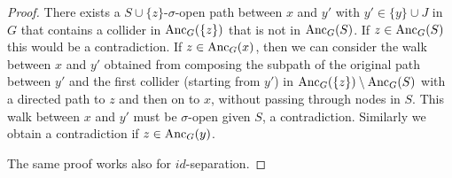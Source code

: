 \begin{proof}
There exists a $S \cup \{z\}$-$\sigma$-open path between $x$ and $y'$ with $y' \in \{y\} \cup J$ in $G$ that contains a collider in $\mathrm{Anc}_{G}(\{z\})$ that is not in $\mathrm{Anc}_{G}(S)$. 
If $z \in \mathrm{Anc}_{G}(S)$ this would be a contradiction.
If $z \in \mathrm{Anc}_{G}(x)$, then we can consider the walk between $x$ and $y'$ obtained from composing the subpath of the original path between $y'$ and the first collider (starting from $y'$) in $\mathrm{Anc}_{G}(\{z\}) \setminus \mathrm{Anc}_{G}(S)$ with a directed path to $z$ and then on to $x$, without passing through nodes in $S$.
This walk between $x$ and $y'$ must be $\sigma$-open given $S$, a contradiction.
Similarly we obtain a contradiction if $z \in \mathrm{Anc}_{G}(y)$.

The same proof works also for $id$-separation.
\end{proof}
